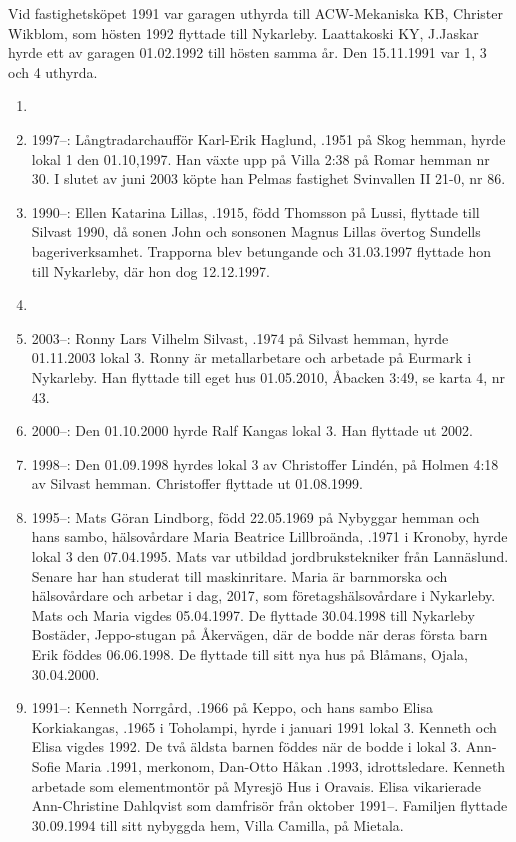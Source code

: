 Vid fastighetsköpet 1991 var garagen uthyrda till ACW-Mekaniska KB, Christer Wikblom, som hösten 1992 flyttade till Nykarleby. Laattakoski KY, J.Jaskar hyrde ett av garagen 01.02.1992 till hösten samma år. Den 15.11.1991 var 1, 3 och 4 uthyrda.
\begin{enumerate}
  \item {}
  \item 1997--: Långtradarchaufför Karl-Erik Haglund, .1951 på Skog hemman, hyrde lokal 1 den 01.10,1997. Han växte upp på Villa 2:38 på Romar hemman nr 30. I slutet av juni 2003 köpte han Pelmas fastighet Svinvallen II 21-0, nr 86.
  \item 1990--: Ellen Katarina Lillas, .1915, född Thomsson på Lussi, flyttade till Silvast 1990, då sonen John och sonsonen Magnus Lillas övertog Sundells bageriverksamhet. Trapporna blev betungande och 31.03.1997	flyttade hon till Nykarleby, där hon dog 12.12.1997.
  \item {}
  \item 2003--: Ronny Lars Vilhelm Silvast, .1974 på Silvast hemman, hyrde	01.11.2003 lokal 3. Ronny är metallarbetare och arbetade på Eurmark i Nykarleby. Han flyttade till eget hus 01.05.2010, Åbacken 3:49, se karta 4, nr 43.
  \item 2000--: Den 01.10.2000 hyrde Ralf Kangas lokal 3. Han flyttade ut 2002.
  \item 1998--: Den 01.09.1998 hyrdes lokal 3 av Christoffer Lindén,  på	Holmen 4:18 av Silvast hemman. Christoffer flyttade ut 01.08.1999.
  \item 1995--: Mats Göran Lindborg, född 22.05.1969 på Nybyggar hemman och hans	sambo, hälsovårdare Maria Beatrice Lillbroända, .1971 i Kronoby, hyrde lokal 3 den 07.04.1995. Mats var utbildad jordbrukstekniker från Lannäslund. Senare har han studerat till maskinritare. Maria är barnmorska och hälsovårdare och arbetar i dag, 	2017, som företagshälsovårdare i Nykarleby. Mats och Maria vigdes 05.04.1997. De flyttade 30.04.1998 till Nykarleby Bostäder, Jeppo-stugan på Åkervägen, där de bodde när deras första barn Erik föddes 06.06.1998. De flyttade till sitt nya hus på Blåmans, Ojala, 30.04.2000.
  \item 1991--: Kenneth Norrgård, .1966 på Keppo, och hans sambo Elisa	Korkiakangas, .1965 i Toholampi, hyrde i januari 1991 lokal 3. Kenneth och Elisa vigdes 1992. De två äldsta barnen föddes när de bodde i lokal 3. Ann-Sofie Maria	.1991, merkonom,	Dan-Otto Håkan	.1993, idrottsledare. Kenneth arbetade som elementmontör på Myresjö Hus i Oravais. Elisa	vikarierade Ann-Christine Dahlqvist som damfrisör från oktober 1991--. Familjen flyttade 30.09.1994 till sitt nybyggda hem, Villa Camilla, på Mietala.

\end{enumerate}

